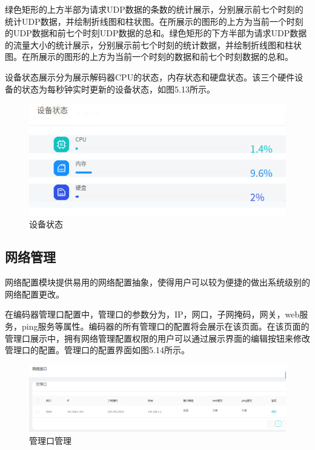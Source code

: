 绿色矩形的上方半部为请求UDP数据的条数的统计展示，分别展示前七个时刻的统计UDP数据，并绘制折线图和柱状图。在所展示的图形的上方为当前一个时刻的UDP数据和前七个时刻UDP数据的总和。绿色矩形的下方半部为请求UDP数据的流量大小的统计展示，分别展示前七个时刻的统计数据，并绘制折线图和柱状图。在所展示的图形的上方为当前一个时刻的数据和前七个时刻数据的总和。

设备状态展示分为展示解码器CPU的状态，内存状态和硬盘状态。该三个硬件设备的状态为每秒钟实时更新的设备状态，如图5.13所示。

\begin{figure}[!htbp]
\centering
\includegraphics[scale=1]{figures/HW/N6.png}
\caption{设备状态}
\end{figure}

\subsection{网络管理}

网络配置模块提供易用的网络配置抽象，使得用户可以较为便捷的做出系统级别的网络配置更改。

在编码器管理口配置中，管理口的参数分为，IP，网口，子网掩码，网关，web服务，ping服务等属性。编码器的所有管理口的配置将会展示在该页面。在该页面的管理口展示中，拥有网络管理配置权限的用户可以通过展示界面的编辑按钮来修改管理口的配置。管理口的配置界面如图5.14所示。

\begin{figure}[!htbp]
\centering
\includegraphics[scale=0.6]{figures/HW/N7.png}
\caption{管理口管理}
\end{figure}

